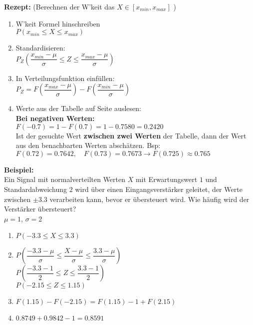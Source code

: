 \begin{multicols}{2}
	\textbf{Rezept:} (Berechnen der W'keit das $X\in[x_{min}, x_{max}]$ )
	\begin{enumerate}
		\item W'keit Formel hinschreiben\\
		$P(x_{min} \leq X \leq x_{max})$
		\item Standardisieren:\\
		$P_Z\left(\dfrac{x_{min}-\mu}{\sigma} \leq Z \leq \dfrac{x_{max}-\mu}{\sigma}\right)$
		\item In Verteilungsfunktion einfüllen:\\
		$P_Z=F\left(\dfrac{x_{max}-\mu}{\sigma}\right) - F\left(\dfrac{x_{min}-\mu}{\sigma}\right)$
		\item Werte aus der Tabelle auf Seite \pageref{tbl_NormVerteilung} auslesen:\\
		\textbf{Bei negativen Werten:}\\
		 $F(-0.7) = 1-F(0.7) = 1-0.7580=0.2420$\\[2pt]
		Ist der gesuchte Wert \textbf{zwischen zwei Werten} der Tabelle, dann der Wert aus den benachbarten Werten abschätzen. Bsp:\\ 
		\small 
		$F(0.72) = 0.7642, \quad F(0.73) = 0.7673 \rightarrow F(0.725) \approx 0.765$
		\normalsize
		
	\end{enumerate}
	\columnbreak
	
	\textbf{Beispiel:}\\
	Ein Signal mit normalverteilten Werten $X$ mit Erwartungswert $1$ und Standardabweichung $2$ wird über einen Eingangsverstärker geleitet, der Werte zwischen $\pm 3.3$ verarbeiten kann, bevor er übersteuert wird. Wie häufig wird der Verstärker übersteuert?\\
	$\mu = 1$, $\sigma = 2$
	\begin{enumerate}
		\item $P(-3.3 \leq X \leq 3.3)$
		\item $P\left( \dfrac{-3.3-\mu}{\sigma}
		\leq \dfrac{X-\mu}{\sigma} 
		\leq \dfrac{3.3-\mu}{\sigma} \right)$\\
		$P\left( \dfrac{-3.3-1}{2} \leq Z \leq \dfrac{3.3-1}{2}\right)$\\
		$P(-2.15 \leq Z \leq 1.15)$
		\item $F(1.15) - F(-2.15) = F(1.15) - 1 + F(2.15)$
		\item $0.8749 + 0.9842 - 1 = 0.8591$
	\end{enumerate}
	
\end{multicols}

